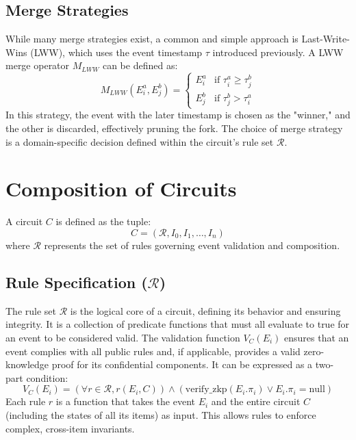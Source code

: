 \documentclass{article}
\begin{document}
\subsection{Merge Strategies}
While many merge strategies exist, a common and simple approach is Last-Write-Wins (LWW), which uses the event timestamp $\tau$ introduced previously. A LWW merge operator $M_{LWW}$ can be defined as:
\begin{equation}
M_{LWW}(E_i^a, E_j^b) = 
\begin{cases} 
E_i^a & \text{if } \tau_i^a \ge \tau_j^b \\
E_j^b & \text{if } \tau_j^b > \tau_i^a
\end{cases}
\end{equation}
In this strategy, the event with the later timestamp is chosen as the "winner," and the other is discarded, effectively pruning the fork. The choice of merge strategy is a domain-specific decision defined within the circuit's rule set $\mathcal{R}$.

\section{Composition of Circuits}

A circuit $C$ is defined as the tuple:
\begin{equation}
C = (\mathcal{R}, I_0, I_1, \dots, I_n)
\end{equation}
where $\mathcal{R}$ represents the set of rules governing event validation and composition.

\subsection{Rule Specification ($\mathcal{R}$)}
The rule set $\mathcal{R}$ is the logical core of a circuit, defining its behavior and ensuring integrity. It is a collection of predicate functions that must all evaluate to true for an event to be considered valid. The validation function $V_C(E_i)$ ensures that an event complies with all public rules and, if applicable, provides a valid zero-knowledge proof for its confidential components. It can be expressed as a two-part condition:
\begin{equation}
V_C(E_i) = (\forall r \in \mathcal{R}, r(E_i, C)) \land (\text{verify\_zkp}(E_i.\pi_i) \lor E_i.\pi_i = \text{null})
\end{equation}
Each rule $r$ is a function that takes the event $E_i$ and the entire circuit $C$ (including the states of all its items) as input. This allows rules to enforce complex, cross-item invariants.
\end{document}
